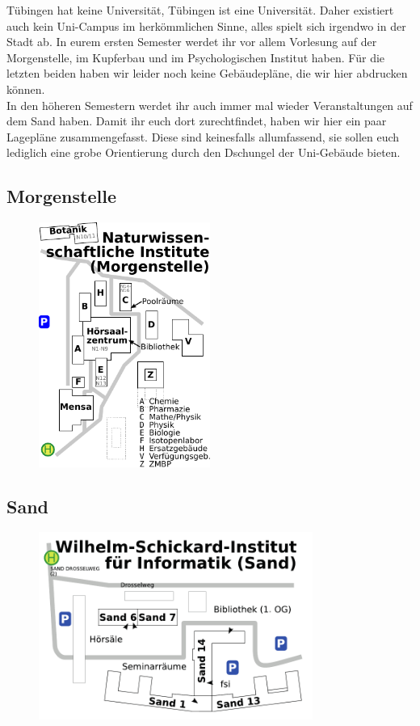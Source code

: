 Tübingen hat keine Universität, Tübingen ist eine Universität. Daher existiert auch kein Uni-Campus im herkömmlichen Sinne, alles spielt sich irgendwo in der Stadt ab.
In eurem ersten Semester werdet ihr vor allem Vorlesung auf der Morgenstelle, im Kupferbau und im Psychologischen Institut haben. Für die letzten beiden haben wir leider noch keine Gebäudepläne, die wir hier abdrucken können.\\
In den höheren Semestern werdet ihr auch immer mal wieder Veranstaltungen auf dem Sand haben. Damit ihr euch dort zurechtfindet, haben wir hier ein paar Lagepläne zusammengefasst. Diese sind keinesfalls allumfassend, sie sollen euch lediglich eine grobe Orientierung durch den Dschungel der Uni-Gebäude bieten.
\subsection*{Morgenstelle}
\begin{figure}[ht!]
\centering
\includegraphics[width=0.5\textwidth]{kogni/anhang/lageplaene/uebersicht_morgenstelle.pdf}
\end{figure}
\newpage
\subsection*{Sand}
\begin{figure}[ht!]
	\centering
	\includegraphics[width=0.8\textwidth]{kogni/anhang/lageplaene/uebersicht_sand.pdf}
\end{figure}
